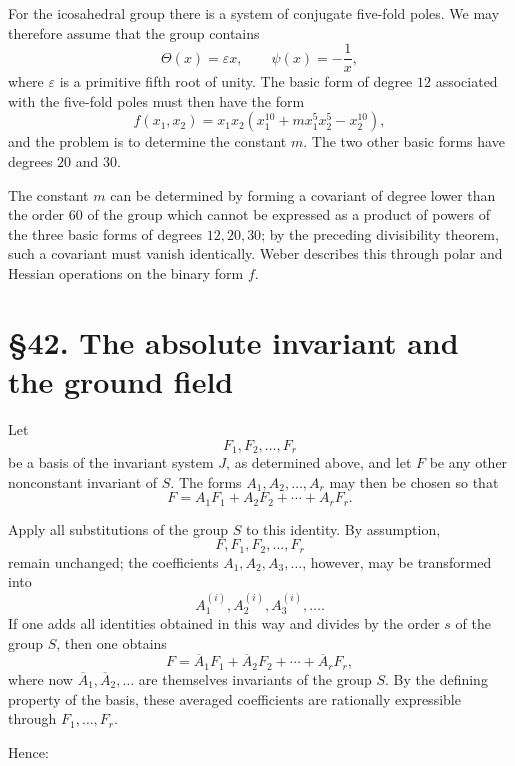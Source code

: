 \documentclass[11pt,a4paper]{book}
\newcommand{\webersection}[2]{\clearpage\section*{\S #1. #2}}
\begin{document}
For the icosahedral group there is a system of conjugate five-fold poles.  We may therefore assume that the group contains
\begin{equation}\label{eq:w9-ico-generators}
 \Theta(x)=\varepsilon x,
 \qquad
 \psi(x)=-\frac1x,
\end{equation}
where $\varepsilon$ is a primitive fifth root of unity.  The basic form of degree $12$ associated with the five-fold poles must then have the form
\begin{equation}\label{eq:w9-ico-f}
 f(x_1,x_2)=x_1x_2(x_1^{10}+m x_1^5x_2^5-x_2^{10}),
\end{equation}
and the problem is to determine the constant $m$.  The two other basic forms have degrees $20$ and $30$.

The constant $m$ can be determined by forming a covariant of degree lower than the order $60$ of the group which cannot be expressed as a product of powers of the three basic forms of degrees $12,20,30$; by the preceding divisibility theorem, such a covariant must vanish identically.  Weber describes this through polar and Hessian operations on the binary form $f$.

\webersection{42}{The absolute invariant and the ground field}

Let
\[
F_1,F_2,\ldots,F_r
\]
be a basis of the invariant system \(J\), as determined above, and let \(F\) be any other nonconstant invariant of \(S\).  The forms \(A_1,A_2,\ldots,A_r\) may then be chosen so that
\begin{equation}
F=A_1F_1+A_2F_2+\cdots+A_rF_r.
\end{equation}

Apply all substitutions of the group \(S\) to this identity.  By assumption,
\[
F,F_1,F_2,\ldots,F_r
\]
remain unchanged; the coefficients \(A_1,A_2,A_3,\ldots\), however, may be transformed into
\[
A_1^{(i)},A_2^{(i)},A_3^{(i)},\ldots .
\]
If one adds all identities obtained in this way and divides by the order \(s\) of the group \(S\), then one obtains
\begin{equation}
F=\overline A_1F_1+\overline A_2F_2+\cdots+\overline A_rF_r,
\end{equation}
where now \(\overline A_1,\overline A_2,\ldots\) are themselves invariants of the group \(S\).  By the defining property of the basis, these averaged coefficients are rationally expressible through \(F_1,\ldots,F_r\).

Hence:
\end{document}
